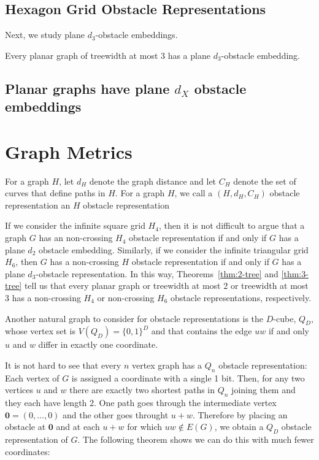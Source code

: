 \documentclass{patmorin}
\begin{document}
\subsection{Hexagon Grid Obstacle Representations}
 
Next, we study plane $d_3$-obstacle embeddings.

\begin{thm}
  Every planar graph of treewidth at most 3 has a plane $d_3$-obstacle embedding.   
\end{thm}

\subsection{Planar graphs have plane $d_{X}$ obstacle embeddings}

\section{Graph Metrics}

For a graph $H$, let $d_H$ denote the graph distance and let $C_H$ denote
the set of curves that define paths in $H$.  For a graph $H$, we call
a $(H,d_H,C_H)$ obstacle representation an $H$ obstacle representation

If we consider the infinite square grid $H_4$, then it is not
difficult to argue that a graph $G$ has an non-crossing $H_4$ obstacle
representation if and only if $G$ has a plane $d_2$ obstacle embedding.
Similarly, if we consider the infinite triangular grid $H_6$, then $G$
has a non-crossing $H$ obstacle representation if and only if $G$ has a
plane $d_3$-obstacle representation.  In this way, Theorems~\ref{thm:2-tree}
and \ref{thm:3-tree} tell us that every planar graph or treewidth at most 2
or treewidth at most 3 has a non-crossing $H_4$ or non-crossing $H_6$
obstacle representations, respectively.

Another natural graph to consider for obstacle representations is the
$D$-cube, $Q_D$, whose vertex set is $V(Q_D)=\{0,1\}^D$ and that contains
the edge $uw$ if and only $u$ and $w$ differ in exactly one coordinate.

It is not hard to see that every $n$ vertex graph has a $Q_n$ obstacle
representation: Each vertex of $G$ is assigned a coordinate with a
single 1 bit.  Then, for any two vertices $u$ and $w$ there are exactly
two shortest paths in $Q_n$ joining them and they each have length 2.
One path goes through the intermediate vertex $\mathbf{0}=(0,\ldots,0)$
and the other goes throught $u+w$.  Therefore by placing an obstacle at
$\mathbf{0}$ and at each $u+w$ for which $uw\not\in E(G)$, we obtain a
$Q_D$ obstacle representation of $G$.  The following theorem shows we
can do this with much fewer coordinates:
\end{document}
